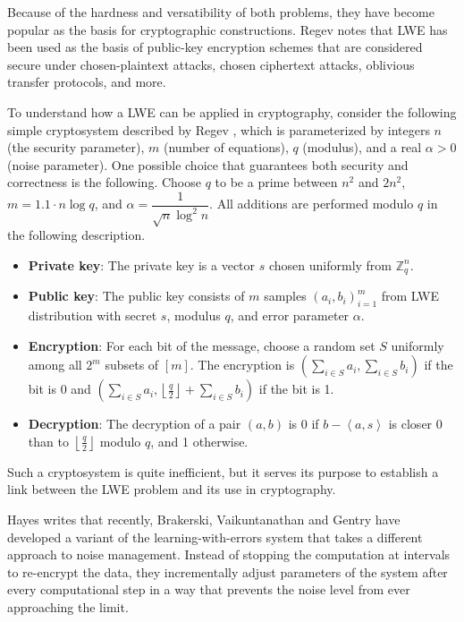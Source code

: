 Because of the hardness and versatibility of both problems, they have become popular as the basis for cryptographic constructions. Regev \cite{regevlearning} notes that LWE has been used as the basis of public-key encryption schemes that are considered secure under chosen-plaintext attacks, chosen ciphertext attacks, oblivious transfer protocols, and more.

To understand how a LWE can be applied in cryptography, consider the following simple cryptosystem described by Regev \cite{regevlearning}, which is parameterized by integers $n$ (the security parameter), $m$ (number of equations), $q$ (modulus), and a real $\alpha > 0$ (noise parameter). One possible choice that guarantees both security and correctness is the following. Choose $q$ to be a prime between $n^2$ and $2n^2$, $m=1.1 \cdot n\log q$, and $\alpha = \dfrac{1}{\sqrt{n} \log^{2}n}$. All additions are performed modulo $q$ in the following description. 

\begin{itemize}
\item \textbf{Private key}: The private key is a vector $s$ chosen uniformly from $\mathbb{Z}_{q}^{n}$.
\item \textbf{Public key}: The public key consists of $m$ samples $(a_{i}, b_{i})_{i=1}^m$ from LWE distribution with secret $s$, modulus $q$, and error parameter $\alpha$.
\item \textbf{Encryption}: For each bit of the message, choose a random set $S$ uniformly among all $2^m$ subsets of $[m]$. The encryption is $(\sum_{i \in S} a_{i}, \sum_{i \in S} b_{i})$ if the bit is 0 and $(\sum_{i \in S} a_{i}, \left \lfloor{\frac{q}{2}}\right \rfloor + \sum_{i \in S} b_{i})$ if the bit is 1.
\item \textbf{Decryption}: The decryption of a pair $(a,b)$ is 0 if $b - \left \langle a,s \right \rangle$ is closer 0 than to $\left \lfloor \frac{q}{2} \right \rfloor$ modulo $q$, and 1 otherwise. 
\end{itemize}
Such a cryptosystem is quite inefficient, but it serves its purpose to establish a link between the LWE problem and its use in cryptography.

Hayes \cite{Hayes2012} writes that recently, Brakerski, Vaikuntanathan and Gentry have developed a variant of the learning-with-errors system that takes a different approach to noise management. Instead of stopping the computation at intervals to re-encrypt the data, they incrementally adjust parameters of the system after every computational step in a way that prevents the noise level from ever approaching the limit.


